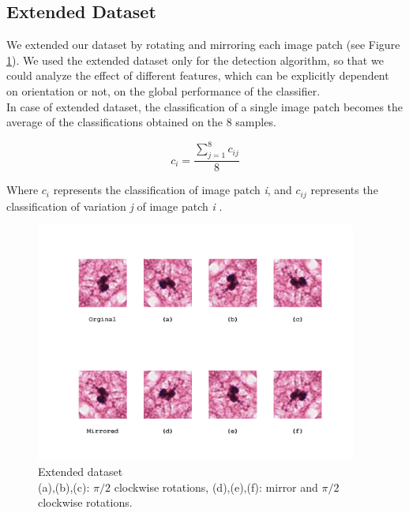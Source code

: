 \vspace{0.5cm}

\subsection{Extended Dataset}

We extended our dataset by rotating and mirroring each image patch (see Figure \ref{ch4:fig1}). We used the extended dataset only for the detection algorithm, so that we could analyze
the effect of different features, which can be explicitly dependent on orientation or not, on the global performance of the classifier.\\
In case of extended dataset, the classification of a single image patch becomes the average of the classifications obtained on the 8 samples.

\begin{equation}
 c_{i} = \frac{\sum_{j=1}^{8} c_{ij}}{8}
\end{equation}

Where $c_{i}$ represents the classification of image patch \textit{i}, and $c_{ij}$ represents the classification of variation \textit{j} of image patch \textit{i} .



\begin{figure}[!hbt]
  \centering
    \includegraphics[width=0.94\textwidth]{./images/rotDataset.png}
  \caption[Extended Dataset]{Extended dataset\\(a),(b),(c): $\pi/2$ clockwise rotations, (d),(e),(f): mirror and $\pi/2$ clockwise rotations.}
  \label{ch4:fig1}
\end{figure}  

